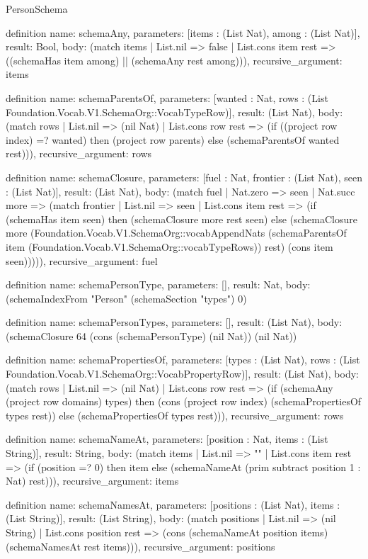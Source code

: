 \begin{lexlean}{PersonSchema}
\begin{semanticmodule}
definition{
  name: schemaAny,
  parameters: [items : (List Nat), among : (List Nat)],
  result: Bool,
  body: (match items
    | List.nil => false
    | List.cons item rest => ((schemaHas item among) || (schemaAny rest among))),
  recursive_argument: items
}

definition{
  name: schemaParentsOf,
  parameters: [wanted : Nat, rows : (List Foundation.Vocab.V1.SchemaOrg::VocabTypeRow)],
  result: (List Nat),
  body: (match rows
    | List.nil => (nil Nat)
    | List.cons row rest => (if ((project row index) =? wanted) then (project row parents) else (schemaParentsOf wanted rest))),
  recursive_argument: rows
}

definition{
  name: schemaClosure,
  parameters: [fuel : Nat, frontier : (List Nat), seen : (List Nat)],
  result: (List Nat),
  body: (match fuel
    | Nat.zero => seen
    | Nat.succ more => (match frontier
      | List.nil => seen
      | List.cons item rest => (if (schemaHas item seen) then (schemaClosure more rest seen) else (schemaClosure more (Foundation.Vocab.V1.SchemaOrg::vocabAppendNats (schemaParentsOf item (Foundation.Vocab.V1.SchemaOrg::vocabTypeRows)) rest) (cons item seen))))),
  recursive_argument: fuel
}

definition{
  name: schemaPersonType,
  parameters: [],
  result: Nat,
  body: (schemaIndexFrom "Person" (schemaSection "types") 0)
}

definition{
  name: schemaPersonTypes,
  parameters: [],
  result: (List Nat),
  body: (schemaClosure 64 (cons (schemaPersonType) (nil Nat)) (nil Nat))
}

definition{
  name: schemaPropertiesOf,
  parameters: [types : (List Nat), rows : (List Foundation.Vocab.V1.SchemaOrg::VocabPropertyRow)],
  result: (List Nat),
  body: (match rows
    | List.nil => (nil Nat)
    | List.cons row rest => (if (schemaAny (project row domains) types) then (cons (project row index) (schemaPropertiesOf types rest)) else (schemaPropertiesOf types rest))),
  recursive_argument: rows
}

definition{
  name: schemaNameAt,
  parameters: [position : Nat, items : (List String)],
  result: String,
  body: (match items
    | List.nil => ""
    | List.cons item rest => (if (position =? 0) then item else (schemaNameAt (prim subtract position 1 : Nat) rest))),
  recursive_argument: items
}

definition{
  name: schemaNamesAt,
  parameters: [positions : (List Nat), items : (List String)],
  result: (List String),
  body: (match positions
    | List.nil => (nil String)
    | List.cons position rest => (cons (schemaNameAt position items) (schemaNamesAt rest items))),
  recursive_argument: positions
}


\end{semanticmodule}
\end{lexlean}
